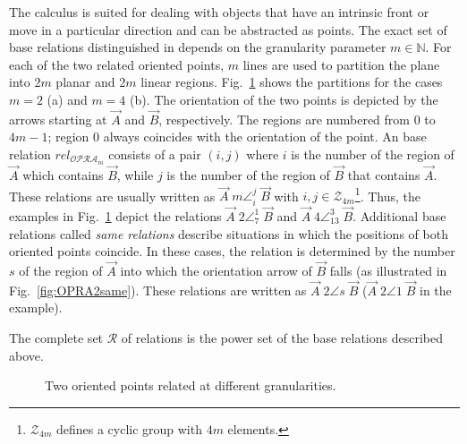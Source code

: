 The \OPRAm{} calculus is suited for dealing with objects that have an intrinsic front or move in a particular direction and can be abstracted as points.
The exact set of base relations distinguished in  \OPRAm{} depends on the
granularity parameter $m\in \mathbb{N}$. For each of the two related oriented points, $m$ lines are used to partition the plane into $2m$ planar and $2m$ linear regions. Fig.~\ref{fig:OPRA} shows the partitions for the cases $m=2$
(a) and $m=4$
(b). The orientation of the two points is depicted by the arrows starting at $\vec{A}$ and $\vec{B}$, respectively. The regions are numbered from 0 to $4m-1$; region 0 always coincides with the orientation of the point. An \OPRAm{} base relation $rel_{\mathcal{OPRA}_m}$ consists of a pair $(i,j)$ where
$i$ is the number of the region of $\vec{A}$ which contains $\vec{B}$, while $j$ is the number of the region of $\vec{B}$ that contains $\vec{A}$. These relations are usually written as $\vec{A} \; {\scriptscriptstyle m}\angle_{i}^{j} \; \vec{B}$ with $i,j\in \mathcal{Z}_{4m}$\footnote{$\mathcal{Z}_{4m}$ defines a cyclic group with $4m$ elements.}. Thus, the examples in Fig.~\ref{fig:OPRA} depict the relations $\vec{A} \; {\scriptscriptstyle 2}\angle_{7}^{1} \; \vec{B}$ and $\vec{A} \; {\scriptscriptstyle 4}\angle_{13}^{3} \; \vec{B}$. Additional base relations called \emph{same relations} describe situations in which the positions of both oriented points coincide. In these cases, the relation is determined by the number $s$ of the region of $\vec{A}$
into which the orientation arrow of $\vec{B}$ falls (as illustrated in Fig.~\ref{fig:OPRA2same}). These relations are written as $\vec{A} \; {\scriptscriptstyle 2}\angle s \; \vec{B}$ ($\vec{A} \; {\scriptscriptstyle 2}\angle 1 \; \vec{B}$ in the example).

The complete set $\mathcal{R}$ of \OPRAm{} relations is the power set
of the base relations described above.

\begin{figure}[tb!]
\begin{flushleft}
	\subfigure[$m=2$: $\vec{A} \; {\scriptscriptstyle 2}\angle_{7}^{1} \; \vec{B}$]{
		\texttt{[image: OPRA2\_Example]}
		\label{fig:OPRA2}
	}
	\subfigure[$m=4$: $\vec{A} \; {\scriptscriptstyle 4}\angle_{13}^{3} \; \vec{B}$]{
		\texttt{[image: OPRA4\_Example]}
		\label{fig:OPRA4}
	}
	\caption{Two oriented points related at different granularities.}
	\label{fig:OPRA}
\end{flushleft}
\end{figure}
